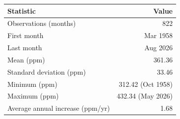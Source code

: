 \begin{tabular}{lr}
\toprule
Statistic & Value\\
\midrule
Observations (months) & 822\\
First month & Mar 1958\\
Last month & Aug 2026\\
Mean (ppm) & 361.36\\
Standard deviation (ppm) & 33.46\\
Minimum (ppm) & 312.42 (Oct 1958)\\
Maximum (ppm) & 432.34 (May 2026)\\
Average annual increase (ppm/yr) & 1.68\\
\bottomrule
\end{tabular}
